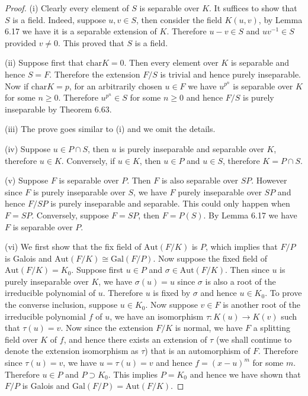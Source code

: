\begin{proof}
(i) Clearly every element of $S$ is separable over $K$. It suffices to show that $S$ is a field. Indeed, suppose $u,v\in S$, then consider the field $K(u,v)$, by Lemma 6.17 we have it is a separable extension of $K$. Therefore $u-v\in S$ and $uv^{-1}\in S$ provided $v\ne 0$. This proved that $S$ is a field.\par
(ii) Suppose first that $\mathrm{char}K=0$. Then every element over $K$ is separable and hence $S=F$. Therefore the extension $F/S$ is trivial and hence purely inseparable. Now if $\mathrm{char}K=p$, for an arbitrarily chosen $u\in F$ we have $u^{p^n}$ is separable over $K$ for some $n\ge 0$. Therefore $u^{p^n}\in S$ for some $n\ge 0$ and hence $F/S$ is purely inseparable by Theorem 6.63.\par
(iii) The prove goes similar to (i) and we omit the details.\par
(iv) Suppose $u\in P\cap S$, then $u$ is purely inseparable and separable over $K$, therefore $u\in K$. Conversely, if $u\in K$, then $u\in P$ and $u\in S$, therefore $K=P\cap S$.\par
(v) Suppose $F$ is separable over $P$. Then $F$ is also separable over $SP$. However since $F$ is purely inseparable over $S$, we have $F$ purely inseparable over $SP$ and hence $F/SP$ is purely inseparable and separable. This could only happen when $F=SP$. Conversely, suppose $F=SP$, then $F=P(S)$. By Lemma 6.17 we have $F$ is separable over $P$.\par
(vi) We first show that the fix field of $\mathrm{Aut}(F/K)$ is $P$, which implies that $F/P$ is Galois and $\mathrm{Aut}(F/K)\cong\mathrm{Gal}(F/P)$. Now suppose the fixed field of $\mathrm{Aut}(F/K)=K_0$. Suppose first $u\in P$ and $\sigma\in\mathrm{Aut}(F/K)$. Then since $u$ is purely inseparable over $K$, we have $\sigma(u)=u$ since $\sigma$ is also a root of the irreducible polynomial of $u$. Therefore $u$ is fixed by $\sigma$ and hence $u\in K_0$. To prove the converse inclusion, suppose $u\in K_0$. Now suppose $v\in F$ is another root of the irreducible polynomial $f$ of $u$, we have an isomorphism $\tau:K(u)\to K(v)$ such that $\tau(u)=v$. Now since the extension $F/K$ is normal, we have $F$ a splitting field over $K$ of $f$, and hence there exists an extension of $\tau$ (we shall continue to denote the extension isomorphism as $\tau$) that is an automorphism of $F$. Therefore since $\tau(u)=v$, we have $u=\tau(u)=v$ and hence $f=(x-u)^m$ for some $m$. Therefore $u\in P$ and $P\supset K_0$. This implies $P=K_0$ and hence we have shown that $F/P$ is Galois and $\mathrm{Gal}(F/P)=\mathrm{Aut}(F/K)$.\par

\end{proof}
